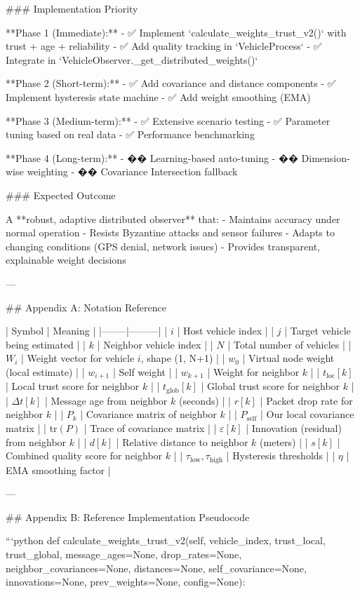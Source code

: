 ### Implementation Priority

**Phase 1 (Immediate):**
- ✅ Implement `calculate_weights_trust_v2()` with trust + age + reliability
- ✅ Add quality tracking in `VehicleProcess`
- ✅ Integrate in `VehicleObserver._get_distributed_weights()`

**Phase 2 (Short-term):**
- ✅ Add covariance and distance components
- ✅ Implement hysteresis state machine
- ✅ Add weight smoothing (EMA)

**Phase 3 (Medium-term):**
- ✅ Extensive scenario testing
- ✅ Parameter tuning based on real data
- ✅ Performance benchmarking

**Phase 4 (Long-term):**
- �� Learning-based auto-tuning
- �� Dimension-wise weighting
- �� Covariance Intersection fallback

### Expected Outcome

A **robust, adaptive distributed observer** that:
- Maintains accuracy under normal operation
- Resists Byzantine attacks and sensor failures
- Adapts to changing conditions (GPS denial, network issues)
- Provides transparent, explainable weight decisions

---

## Appendix A: Notation Reference

| Symbol | Meaning |
|--------|---------|
| \(i\) | Host vehicle index |
| \(j\) | Target vehicle being estimated |
| \(k\) | Neighbor vehicle index |
| \(N\) | Total number of vehicles |
| \(W_i\) | Weight vector for vehicle \(i\), shape (1, N+1) |
| \(w_0\) | Virtual node weight (local estimate) |
| \(w_{i+1}\) | Self weight |
| \(w_{k+1}\) | Weight for neighbor \(k\) |
| \(t_{\text{loc}}[k]\) | Local trust score for neighbor \(k\) |
| \(t_{\text{glob}}[k]\) | Global trust score for neighbor \(k\) |
| \(\Delta t[k]\) | Message age from neighbor \(k\) (seconds) |
| \(r[k]\) | Packet drop rate for neighbor \(k\) |
| \(P_k\) | Covariance matrix of neighbor \(k\) |
| \(P_{\text{self}}\) | Our local covariance matrix |
| \(\text{tr}(P)\) | Trace of covariance matrix |
| \(\varepsilon[k]\) | Innovation (residual) from neighbor \(k\) |
| \(d[k]\) | Relative distance to neighbor \(k\) (meters) |
| \(s[k]\) | Combined quality score for neighbor \(k\) |
| \(\tau_{\text{low}}, \tau_{\text{high}}\) | Hysteresis thresholds |
| \(\eta\) | EMA smoothing factor |

---

## Appendix B: Reference Implementation Pseudocode

```python
def calculate_weights_trust_v2(self, vehicle_index, trust_local, trust_global,
                                message_ages=None, drop_rates=None, 
                                neighbor_covariances=None, distances=None,
                                self_covariance=None, innovations=None,
                                prev_weights=None, config=None):
    

